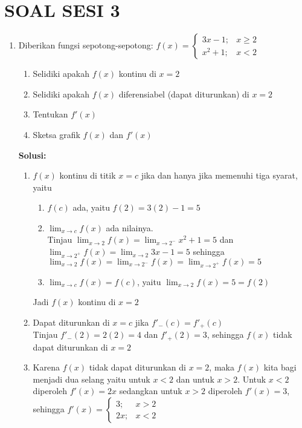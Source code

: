 \documentclass{article}
\begin{document}
\section*{SOAL SESI 3}
\begin{enumerate}
	\item Diberikan fungsi sepotong-sepotong: $f(x) =\begin{cases} 3x-1; &x\geq 2 \\ x^2+1; &x<2\end{cases}$
	\begin{enumerate}
		\item Selidiki apakah $f(x)$ kontinu di $x=2$
		\item Selidiki apakah $f(x)$ diferensiabel (dapat diturunkan) di $x=2$
		\item Tentukan $f'(x)$
		\item Sketsa grafik $f(x)$ dan $f'(x)$
	\end{enumerate}
	\textbf{Solusi:}
	\begin{enumerate}
		\item $f(x)$ kontinu di titik $x=c$ jika dan hanya jika memenuhi tiga syarat, yaitu 
		\begin{enumerate}
			\item $f(c)$ ada, yaitu $f(2)=3(2)-1=5$
			\item $\displaystyle \lim_{x\rightarrow c} f(x) $ ada nilainya. \\Tinjau $\displaystyle \lim_{x\rightarrow 2} f(x) = \lim_{x\rightarrow 2^-} x^2+1 = 5$ dan $\displaystyle \lim_{x\rightarrow 2^+} f(x) = \lim_{x\rightarrow 2} 3x-1 = 5$ sehingga $\displaystyle \lim_{x\rightarrow 2} f(x) =\lim_{x\rightarrow 2^-} f(x)=\lim_{x\rightarrow 2^+} f(x) =5$
			\item $\displaystyle \lim_{x\rightarrow c} f(x) = f(c)$, yaitu $\displaystyle \lim_{x\rightarrow 2} f(x) = 5 = f(2)$
		\end{enumerate}
		Jadi $f(x)$ kontinu di $x=2$
		\item Dapat diturunkan di $x=c$ jika $f'_-(c)=f'_+(c)$\\
		Tinjau $f'_-(2)=2(2)=4$ dan $f'_+(2)=3$, sehingga $f(x)$ tidak dapat diturunkan di $x=2$
		\item Karena $f(x)$ tidak dapat diturunkan di $x=2$, maka $f(x)$ kita bagi menjadi dua selang yaitu untuk $x<2$ dan untuk $x>2$. Untuk $x<2$ diperoleh $f'(x)=2x$ sedangkan untuk $x>2$ diperoleh $f'(x)=3$, sehingga $f'(x)=\begin{cases}3; &x>2 \\ 2x; &x<2\end{cases}$

\end{enumerate}
\end{enumerate}
\end{document}
